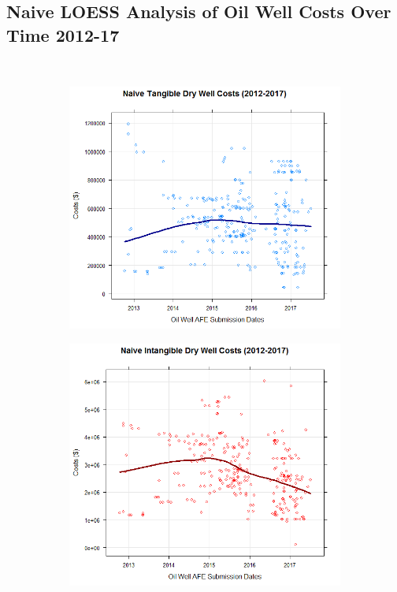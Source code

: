 \documentclass{article}
\begin{document}
\begin{enumerate}

\section{Naive LOESS Analysis of Oil Well Costs Over Time 2012-17}
\\
\begin{figure}[h]
\centering
\begin{subfigure}{.5\textwidth}
  \centering
  \includegraphics[width=.8\linewidth]{NaiveTangibleDry}
  \label{fig:sub1}
\end{subfigure}%
\begin{subfigure}{.5\textwidth}
  \centering
  \includegraphics[width=.8\linewidth]{NaiveIntangibleDry}
  \label{fig:sub2}
\end{subfigure}

\end{figure}
\end{enumerate}
\end{document}
